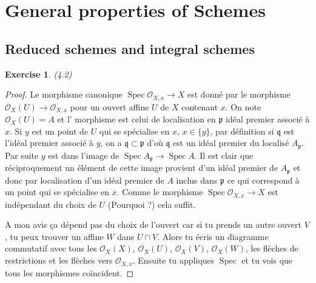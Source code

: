 \documentclass[A4, 11pt]{article}
\newtheorem{exer}{Exercise}
\def\Spec{ \operatorname{Spec}}
\begin{document}
\section{General properties of Schemes}
\subsection{Reduced schemes and integral schemes}
\begin{exer} (4.2)
\end{exer}
\begin{proof}
Le morphisme canonique $\Spec \mathcal{O}_{X,x} \rightarrow X$ est donné par le morphisme 
$\mathcal{O}_{X}(U) \rightarrow \mathcal{O}_{X,x}$ pour un ouvert affine $U$ de $X$ contenant $x$. On note $\mathcal{O}_{X}(U)=A$ et l' morphisme est celui de localisation en $\mathfrak{p}$ idéal premier associé à $x$. Si $y$ est un point de $U$ qui se spécialise en $x$, $x\in \overline{\{y\}}$, par définition si $\mathfrak{q}$ est l'idéal premier associé à $y$, on a $\mathfrak{q} \subset \mathfrak{p}$ d'où $\mathfrak{q}$ est un idéal premier du localisé $A_{\mathfrak{p}}$. Par suite $y$ est dans l'image de $\Spec A_{\mathfrak{p}} \rightarrow \Spec A$. Il est clair que réciproquement un élément de cette image provient d'un idéal premier de $A_{\mathfrak{p}}$ et donc par localisation d'un idéal premier de $A$ inclus dans $\mathfrak{p}$ ce qui correspond à un point qui se spécialise en $x$. Comme le morphisme $\Spec \mathcal{O}_{X,x} \rightarrow X$ est indépendant du choix de $U$ (Pourquoi ?) cela suffit.

{\color{blue} A mon avis ça dépend pas du choix de l'ouvert car si tu prends un autre ouvert $V$, tu peux trouver un affine $W$ dans $U\cap V$. Alors tu écris un diagramme commutatif avec tous les $\mathcal{O}_X(X)$, $\mathcal{O}_X(U)$, $\mathcal{O}_X(V)$, $\mathcal{O}_X(W)$, les flèches de restrictions et les flèches vers $\mathcal{O}_{X,x}$. Ensuite tu appliques $\Spec$ et tu vois que tous les morphismes coïncident.}

\end{proof}
\end{document}
